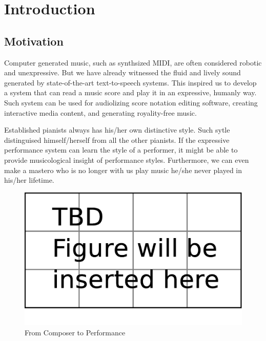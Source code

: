 \chapter{Introduction}
\section{Motivation}
Computer generated music, such as synthsized MIDI, are often considered robotic and unexpressive. But we have already witnessed the fluid and lively sound generated by state-of-the-art text-to-speech systems. This inspired us to develop a system that can read a music score and play it in an expressive, humanly way. Such system can be used for audiolizing score notation editing software, creating interactive media content, and generating royality-free music. 

Established pianists always has his/her own distinctive style. Such sytle distinguised himself/herself from all the other pianists. If the expressive performance system can learn the style of a performer, it might be able to provide musicological insight of performance styles. Furthermore, we can even make a mastero who is no longer with us play music he/she never played in his/her lifetime.



\begin{figure}[tp]
   \begin{center}
      \includegraphics[width=\textwidth]{fig/TBDFigure}

   \end{center}
   \caption{From Composer to Performance}
   \label{fig:concept}
\end{figure}



